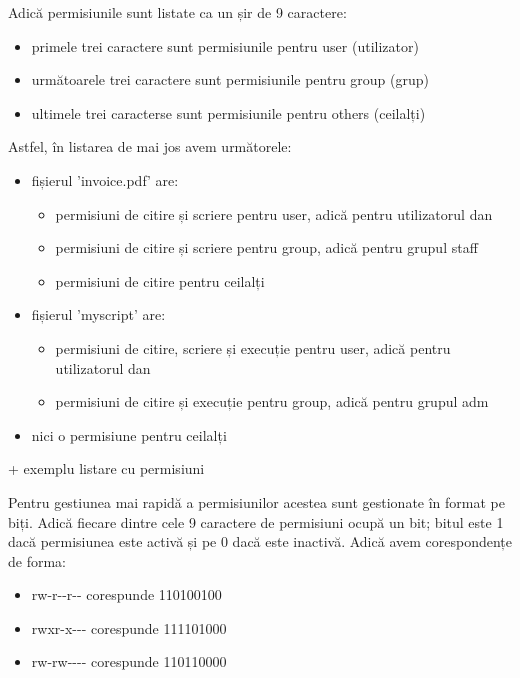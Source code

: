 Adică permisiunile sunt listate ca un șir de 9 caractere:

\begin{itemize}
	\item primele trei caractere sunt permisiunile pentru user (utilizator)
	\item următoarele trei caractere sunt permisiunile pentru group (grup)
	\item ultimele trei caracterse sunt permisiunile pentru others (ceilalți)
\end{itemize}

Astfel, în listarea de mai jos avem următorele:

\begin{itemize}
	\item fișierul 'invoice.pdf' are:
	\begin{itemize}
		\item permisiuni de citire și scriere pentru user, adică pentru
			utilizatorul dan
		\item permisiuni de citire și scriere pentru group, adică pentru
			grupul staff
		\item permisiuni de citire pentru ceilalți
	\end{itemize}
	\item fișierul 'myscript' are:
	\begin{itemize}
		\item permisiuni de citire, scriere și execuție pentru user,
			adică pentru utilizatorul dan
		\item permisiuni de citire și execuție pentru group, adică
			pentru grupul adm
	\end{itemize}
	\item nici o permisiune pentru ceilalți
\end{itemize}

+ exemplu listare cu permisiuni

Pentru gestiunea mai rapidă a permisiunilor acestea sunt gestionate în format pe
biți. Adică fiecare dintre cele 9 caractere de permisiuni ocupă un bit; bitul
este 1 dacă permisiunea este activă și pe 0 dacă este inactivă. Adică avem
corespondențe de forma:

\begin{itemize}
	\item rw-r-{}-r-{}- corespunde 110100100
	\item rwxr-x-{}-{}- corespunde 111101000
	\item rw-rw-{}-{}-{}- corespunde 110110000
\end{itemize}

